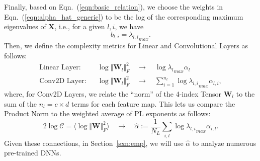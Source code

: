Finally, based on Eqn.~(\ref{eqn:basic_relation}), we choose the weights in Eqn.~(\ref{eqn:alpha_hat_generic}) to be the log of the corresponding maximum eigenvalues of $\mathbf{X}$, i.e., for a given $l,i$, we have 
$$
b_{l,i} = {\lambda_{l,i}}_{max}  .
$$
Then, we define the complexity metrics for Linear and Convolutional Layers as follows:
\begin{eqnarray*}
\text{Linear Layer:} & & \log\Vert\mathbf{W}_{l}\Vert^{2}_{F} \quad \rightarrow \quad \log{\lambda_{l}}_{max}\alpha_{l}  \\
\text{Conv2D Layer:} & & \log\Vert\mathbf{W}_{l}\Vert^{2}_{F} \quad \rightarrow \quad \sum_{i=1}^{n_{l}}\log{\lambda_{l,i}}_{max}\alpha_{l,i}  , 
\end{eqnarray*}
where, for Conv2D Layers, we relate the ``norm'' of the 4-index Tensor $\mathbf{W}_{l}$ to the sum of the $n_{l}=c\times d$ terms for each feature map.
This lets us compare the Product Norm to the weighted average of PL exponents as follows:
\begin{equation}
2\log\mathcal{C}=\langle\log\Vert\mathbf{W}\Vert^{2}_{F}\rangle \quad \rightarrow \quad \hat{\alpha} := \dfrac{1}{N_{L}}\sum_{i,l}\log {\lambda_{l,i}}_{max}\alpha_{i,l}  .
\label{eqn:alpha_hat_specific}
\end{equation}
Given these connections, in Section~\ref{sxn:emp}, we will use $\hat{\alpha}$ to analyze numerous pre-trained DNNs.




